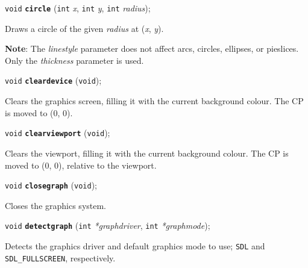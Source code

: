 \documentclass[a4paper,12pt]{article}
\newcommand{\V}{\texttt{void}}      %
\newcommand{\I}{\texttt{int}}       %
\newcommand{\func}[1]{\textbf{\texttt{#1}}}  %
\newcommand{\A}[1]{\emph{#1}}       %
\newcommand{\T}[1]{\texttt{#1}}     %
\newenvironment{bgi}
{ %
  \begin{snugshade}
}
{ %
  \end{snugshade}
}
\begin{document}

\label{sec:circle}

\begin{bgi}
\V{} \func{circle} (\I{} \A{x}, \I{} \A{y}, \I{} \A{radius});
\end{bgi}

Draws a circle of the given \A{radius} at (\A{x}, \A{y}).

\textbf{Note}: The \A{linestyle} parameter does not affect arcs,
circles, ellipses, or pie\-slices. Only the \A{thickness} parameter is
used.


\label{sec:cleardevice}

\begin{bgi}
\V{} \func{cleardevice} (\V{});
\end{bgi}

Clears the graphics screen, filling it with the current background
colour. The CP is moved to (0, 0).


\label{sec:clearviewport}

\begin{bgi}
\V{} \func{clearviewport} (\V{});
\end{bgi}

Clears the viewport, filling it with the current background colour.
The CP is moved to (0, 0), relative to the viewport.


\label{sec:closegraph}

\begin{bgi}
\V{} \func{closegraph} (\V{});
\end{bgi}

Closes the graphics system.


\label{sec:detectgraph}

\begin{bgi}
\V{} \func{detectgraph} (\I{} \A{*graphdriver}, \I{} \A{*graphmode});
\end{bgi}

Detects the graphics driver and default graphics mode to use; \T{SDL}
and \T{SDL\_FULLSCREEN}, respectively.
\end{document}
